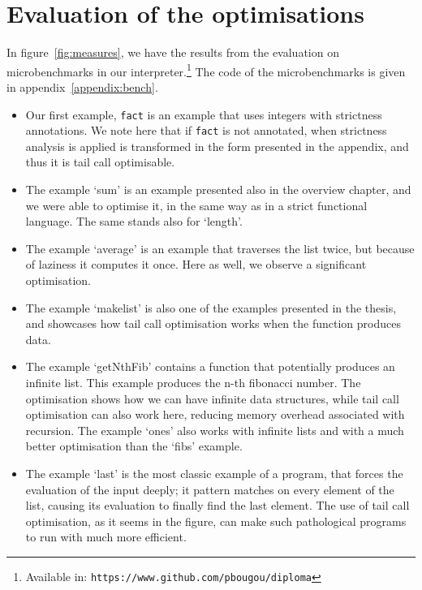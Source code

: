 \documentclass[diploma]{softlab-thesis}
\begin{document}


\chapter {Evaluation of the optimisations}
\label{ch:evaluation}

In figure~\ref{fig:measures}, we have the results from the evaluation on microbenchmarks in our 
interpreter.\footnote{Available in: \texttt{https://www.github.com/pbougou/diploma}} The code of the microbenchmarks is given in appendix~\ref{appendix:bench}.

\begin{itemize}
  \item Our first example, \texttt{fact} is an example that uses integers with strictness annotations. 
  We note here that if \texttt{fact} is not annotated, when strictness analysis is applied is 
  transformed in the form presented in the appendix, and thus it is tail call optimisable.
  \item The example `sum' is an example presented also in the overview chapter, and we were able to 
  optimise it, in the same way as in a strict functional language. The same stands also for `length'.
  \item The example `average' is an example that traverses the list twice, but because of laziness it computes it 
  once. Here as well, we observe a significant optimisation.
  \item The example `makelist' is also one of the examples presented in the thesis, and showcases 
  how tail call optimisation works when the function produces data.
  \item The example `getNthFib' contains a function that potentially produces an infinite list. 
  This example produces the n-th fibonacci number. The optimisation shows how we can have infinite data 
  structures, while tail call optimisation can also work here, reducing memory overhead associated 
  with recursion. The example `ones' also works with infinite lists and with a much better optimisation 
  than the `fibs' example.
  \item The example `last' is the most classic example of a program, that forces the evaluation of 
  the input deeply; it pattern matches on every element of the list, causing its evaluation to 
  finally find the last element. The use of tail call optimisation, as it seems in the figure,
  can make such pathological programs to run with much more efficient.
\end{itemize}
\end{document}
